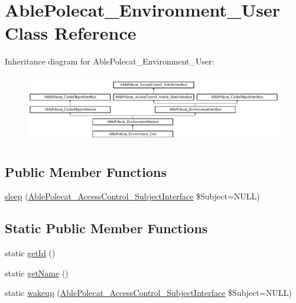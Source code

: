 \hypertarget{class_able_polecat___environment___user}{}\section{Able\+Polecat\+\_\+\+Environment\+\_\+\+User Class Reference}
\label{class_able_polecat___environment___user}
Inheritance diagram for Able\+Polecat\+\_\+\+Environment\+\_\+\+User\+:\begin{figure}[H]
\begin{center}
\leavevmode
\includegraphics[height=3.010753cm]{class_able_polecat___environment___user}
\end{center}
\end{figure}
\subsection*{Public Member Functions}
\begin{DoxyCompactItemize}
\item 
\hyperlink{class_able_polecat___environment___user_a365e24d7b066205cafa2a5cce3a4f224}{sleep} (\hyperlink{interface_able_polecat___access_control___subject_interface}{Able\+Polecat\+\_\+\+Access\+Control\+\_\+\+Subject\+Interface} \$Subject=N\+U\+L\+L)
\end{DoxyCompactItemize}
\subsection*{Static Public Member Functions}
\begin{DoxyCompactItemize}
\item 
static \hyperlink{class_able_polecat___environment___user_acfaa3a96d0cb5a4c0d4d710dcba41e9e}{get\+Id} ()
\item 
static \hyperlink{class_able_polecat___environment___user_a4ef9bd37ba3ce8a13c1e8bcf4f72a630}{get\+Name} ()
\item 
static \hyperlink{class_able_polecat___environment___user_a3f2135f6ad45f51d075657f6d20db2cd}{wakeup} (\hyperlink{interface_able_polecat___access_control___subject_interface}{Able\+Polecat\+\_\+\+Access\+Control\+\_\+\+Subject\+Interface} \$Subject=N\+U\+L\+L)
\end{DoxyCompactItemize}
